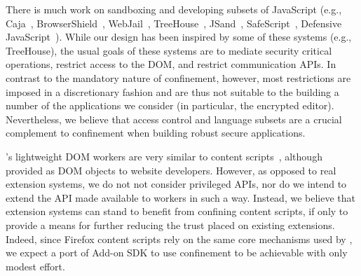 %



There is much work on sandboxing and developing subsets of JavaScript (e.g.,
Caja~\cite{GoogleCaja}, BrowserShield~\cite{Reis:2007},
WebJail~\cite{VanAcker:2011}, TreeHouse~\cite{Ingram:2012},
JSand~\cite{Agten:2012:JCC}, SafeScript~\cite{SafeScript}, Defensive
JavaScript~\cite{djs}). 
%
While our design has been inspired by some of these systems (e.g., TreeHouse), the
usual goals of these systems are to mediate security
critical operations, restrict access to the DOM, and restrict communication APIs\@.
%
In contrast to the mandatory nature of confinement, however, most restrictions
are imposed in a discretionary fashion and are thus not suitable to the
building a number of the applications we consider (in particular, the encrypted
editor).
%
Nevertheless, we believe that access control and language subsets are a crucial
complement to confinement when building robust secure applications.



%
\sys{}'s lightweight DOM workers are very similar to content
scripts~\cite{Carlini:2012}, although provided as DOM objects to
website developers.
%
However, as opposed to real extension systems, we do not not consider
privileged APIs, nor do we intend to extend the API made available to
workers in such a way.
%
Instead, we believe that extension systems can stand to benefit from
confining content scripts, if only to provide a means for further
reducing the trust placed on existing extensions.
%
Indeed, since Firefox content scripts rely on the same core mechanisms
used by \sys{}, we expect a port of Add-on SDK to use confinement to
be achievable with only modest effort.
 

